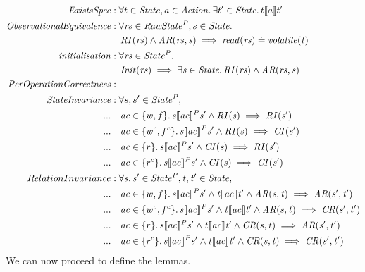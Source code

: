 \documentclass[a4paper,11pt]{article}
\theoremstyle{definition}
\begin{document}
\begin{align*}
	\mathit{ExistsSpec} &: \forall t \in \mathit{State}, a \in \mathit{Action} \ldotp \exists t' \in \mathit{State} \ldotp t \llbracket a \rrbracket t'\\
	\mathit{Observational Equivalence} &: \forall \mathit{rs} \in \mathit{RawState^P},s \in \mathit{State} \ldotp\\
	 & \quad \mathit{RI(rs)} \land \mathit{AR(rs, s)} \implies \mathit{read(rs)} \doteq \mathit{volatile(t)}\\
	\mathit{initialisation} &: \forall \mathit{rs} \in \mathit{State^P} \ldotp\\
	 &\quad \mathit{Init(rs) \implies \exists s \in State \ldotp RI(rs) \land AR(rs, s)}\\
	\mathit{PerOperationCorrectness} &:\\
	 \mathit{StateInvariance} &: \forall s, s' \in \mathit{State^P},\\
	...	 &\quad \mathit{ac} \in \{w, f\} \ldotp \mathit{s \llbracket ac \rrbracket^P s' \land RI(s) \implies RI(s')}\\
	...	 &\quad \mathit{ac} \in \{w^c, f^c\} \ldotp \mathit{s \llbracket ac \rrbracket^P s' \land RI(s) \implies CI(s')}\\
	...	 &\quad \mathit{ac} \in \{r\} \ldotp \mathit{s \llbracket ac \rrbracket^P s' \land CI(s) \implies RI(s')}\\
	...	 &\quad \mathit{ac} \in \{r^c\} \ldotp \mathit{s \llbracket ac \rrbracket^P s' \land CI(s) \implies CI(s')}\\
	RelationInvariance &: \mathit{\forall s, s' \in State^P, t, t' \in State,}\\
	...	& \quad \mathit{ac} \in \{w, f\} \ldotp \mathit{s \llbracket ac \rrbracket^P s' \land t \llbracket ac \rrbracket t' \land AR(s, t) \implies AR(s', t')}\\
	...	& \quad \mathit{ac} \in \{w^c, f^c\} \ldotp \mathit{s \llbracket ac \rrbracket^P s' \land t \llbracket ac \rrbracket t' \land AR(s, t) \implies CR(s', t')}\\
	...	& \quad \mathit{ac} \in \{r\} \ldotp \mathit{s \llbracket ac \rrbracket^P s' \land t \llbracket ac \rrbracket t' \land CR(s, t) \implies AR(s', t')}\\
	...	& \quad \mathit{ac} \in \{r^c\} \ldotp \mathit{s \llbracket ac \rrbracket^P s' \land t \llbracket ac \rrbracket t' \land CR(s, t) \implies CR(s', t')}\\
\end{align*}
We can now proceed to define the lemmas.
\end{document}
